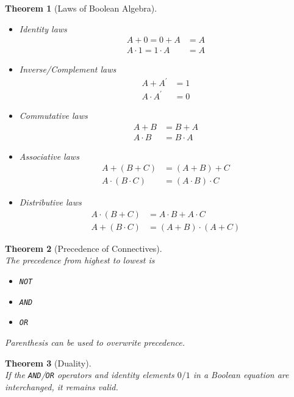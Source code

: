 \documentclass[12pt]{article}
\newtheorem{theorem}{Theorem}[section]
\theoremstyle{definition}
\begin{document}
\begin{theorem}[Laws of Boolean Algebra]
\hfill\\\normalfont
\begin{itemize}
  \item Identity laws
  \begin{align*}
A+0=0+A&=A\\A\cdot 1 = 1\cdot A &= A
  \end{align*}
  \item Inverse/Complement laws
  \begin{align*}
  A+A^\prime &= 1\\A\cdot A^\prime &= 0
  \end{align*}
  \item Commutative laws
  \begin{align*}
  A+B &= B+A\\A\cdot B &= B\cdot A
  \end{align*}
  \item Associative laws
\begin{align*}
A+(B+C)&=(A+B)+C\\ A\cdot(B\cdot C) &= (A\cdot B)\cdot C
\end{align*}
\item Distributive laws
\begin{align*}
A\cdot(B+C)&=A\cdot B + A\cdot C\\ A+(B\cdot C) &= (A+B)\cdot(A+C)
\end{align*}
\end{itemize}
\end{theorem}
\begin{theorem}[Precedence of Connectives]
\hfill\\\normalfont The precedence from highest to lowest is
\begin{itemize}
  \item \texttt{NOT}
  \item \texttt{AND}
  \item \texttt{OR}
\end{itemize}
Parenthesis can be used to overwrite precedence.
\end{theorem}
\begin{theorem}[Duality]
\hfill\\\normalfont If the \texttt{AND}/\texttt{OR} operators and identity elements $0/1$ in a Boolean equation are interchanged, it remains valid.
\end{theorem}
\end{document}
